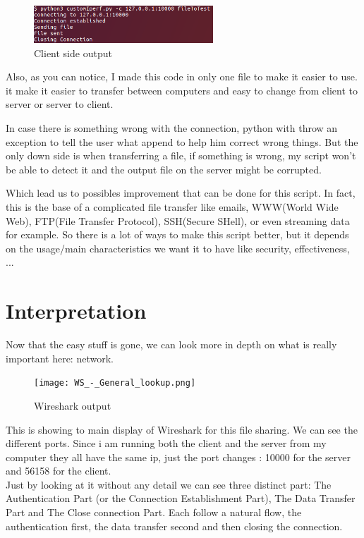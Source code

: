 \documentclass[a4paper]{article}
\begin{document}
\begin{figure}[H]
\centering
\includegraphics[width=0.6\textwidth]{clientSide.png}
\caption{Client side output}
\end{figure}

Also, as you can notice, I made this code in only one file to make it easier to use. %
it make it easier to transfer between computers and easy to change from client to server or server to client.

In case there is something wrong with the connection, python with throw an exception to tell the user what append to help him correct wrong things. But the only down side is when transferring a file, if something is wrong, my script won't be able to detect it and the output file on the server might be corrupted.

Which lead us to possibles improvement that can be done for this script.
In fact, this is the base of a complicated file transfer like emails, WWW(World Wide Web), FTP(File Transfer Protocol), SSH(Secure SHell), or even streaming data for example.
So there is a lot of ways to make this script better, but it depends on the usage/main characteristics we want it to have like security, effectiveness, ...

\newpage
\section{Interpretation}

Now that the easy stuff is gone, we can look more in depth on what is really important here: network.

\begin{figure}[H]
\centering
\texttt{[image: WS\_-\_General\_lookup.png]}
\caption{Wireshark output}
\end{figure}

This is showing to main display of Wireshark for this file sharing.
We can see the different ports.
Since i am running both the client and the server from my computer they all have the same ip, just the port changes : 10000 for the server and 56158 for the client.\\
Just by looking at it without any detail we can see three distinct part: The Authentication Part (or the Connection Establishment Part), The Data Transfer Part and The Close connection Part. Each follow a natural flow, the authentication first, the data transfer second and then closing the connection. 
\end{document}
